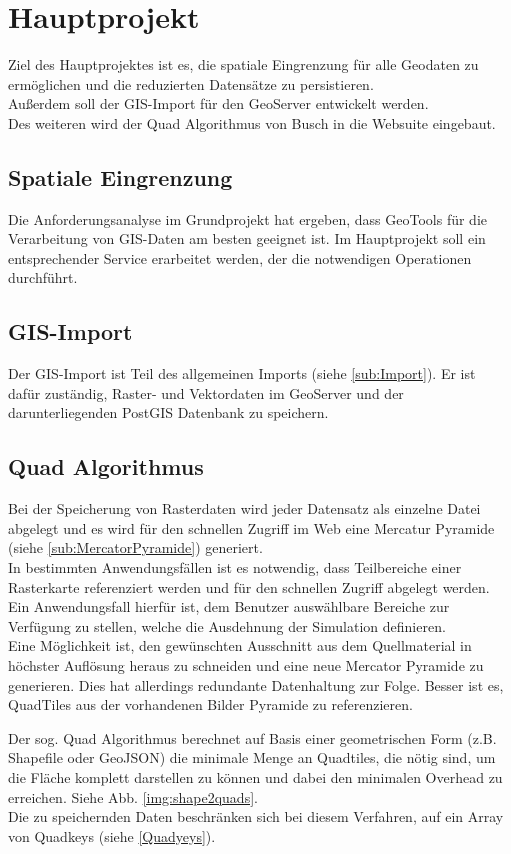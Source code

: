 \documentclass[10pt,conference,compsocconf]{IEEEtran}
\begin{document}
\section{Hauptprojekt}
Ziel des Hauptprojektes ist es, die spatiale Eingrenzung für alle Geodaten zu ermöglichen und die reduzierten Datensätze zu persistieren.\\
Außerdem soll der GIS-Import für den GeoServer entwickelt werden.\\
Des weiteren wird der Quad Algorithmus von Busch\cite{JanBusch} in die Websuite eingebaut.

\subsection{Spatiale Eingrenzung}
Die Anforderungsanalyse im Grundprojekt hat ergeben, dass GeoTools für die Verarbeitung von GIS-Daten am besten geeignet ist. Im Hauptprojekt soll ein entsprechender Service erarbeitet werden, der die notwendigen Operationen durchführt.


\subsection{GIS-Import}
Der GIS-Import ist Teil des allgemeinen Imports (siehe \ref{sub:Import}). Er ist dafür zuständig, Raster- und Vektordaten im GeoServer und der darunterliegenden PostGIS Datenbank zu speichern.


\subsection{Quad Algorithmus}
Bei der Speicherung von Rasterdaten wird jeder Datensatz als einzelne Datei abgelegt und es wird für den schnellen Zugriff im Web eine Mercatur Pyramide (siehe \ref{sub:MercatorPyramide}) generiert.\\
In bestimmten Anwendungsfällen ist es notwendig, dass Teilbereiche einer Rasterkarte referenziert werden und für den schnellen Zugriff abgelegt werden. Ein Anwendungsfall hierfür ist, dem Benutzer auswählbare Bereiche zur Verfügung zu stellen, welche die Ausdehnung der Simulation definieren.\\
\indent Eine Möglichkeit ist, den gewünschten Ausschnitt aus dem Quellmaterial in höchster Auflösung heraus zu schneiden und eine neue Mercator Pyramide zu generieren. Dies hat allerdings redundante Datenhaltung zur Folge. Besser ist es, QuadTiles aus der vorhandenen Bilder Pyramide zu referenzieren.\par
Der sog. Quad Algorithmus\cite{JanBusch} berechnet auf Basis einer geometrischen Form (z.B. Shapefile oder GeoJSON) die minimale Menge an Quadtiles, die nötig sind, um die Fläche komplett darstellen zu können und dabei den minimalen Overhead zu erreichen. Siehe Abb. \ref{img:shape2quads}.\\
Die zu speichernden Daten beschränken sich bei diesem Verfahren, auf ein Array von Quadkeys (siehe \ref{Quadyeys}).
\end{document}
